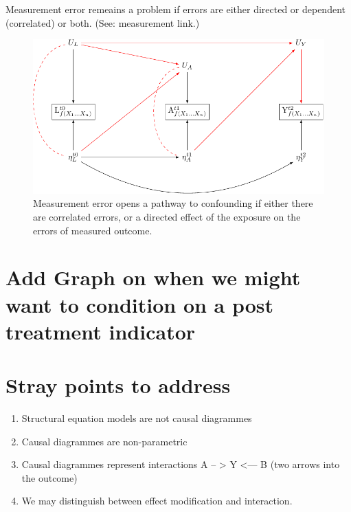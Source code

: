 \documentclass[
  singlecolumn]{report}
\providecommand{\tightlist}{%
  \setlength{\itemsep}{0pt}\setlength{\parskip}{0pt}}\usepackage{longtable,booktabs,array}
\begin{document}
Measurement error remeains a problem if errors are either directed or
dependent (correlated) or both. (See: measurement link.)

\begin{figure}

{\centering \includegraphics[width=1\textwidth,height=\textheight]{causal-dags_files/figure-pdf/fig-dag-dep-udir-effect-confounders-3wave-1.pdf}

}

\caption{\label{fig-dag-dep-udir-effect-confounders-3wave}Measurement
error opens a pathway to confounding if either there are correlated
errors, or a directed effect of the exposure on the errors of measured
outcome.}

\end{figure}

\hypertarget{add-graph-on-when-we-might-want-to-condition-on-a-post-treatment-indicator}{%
\section{Add Graph on when we might want to condition on a post
treatment
indicator}\label{add-graph-on-when-we-might-want-to-condition-on-a-post-treatment-indicator}}

\hypertarget{stray-points-to-address}{%
\section{Stray points to address}\label{stray-points-to-address}}

\begin{enumerate}
\def\labelenumi{\arabic{enumi}.}
\tightlist
\item
  Structural equation models are not causal diagrammes
\item
  Causal diagrammes are non-parametric
\item
  Causal diagrammes represent interactions A -- \textgreater{} Y
  \textless--- B (two arrows into the outcome)
\item
  We may distinguish between effect modification and interaction.
\end{enumerate}
\end{document}
